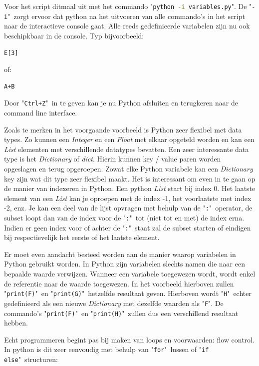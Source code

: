 \documentclass[11pt,twoside]{article}
\begin{document}
Voor het script ditmaal uit met het commando "\lstinline[language=bash]{python -i variables.py}". De "\lstinline[language=bash]{-i}"\ zorgt ervoor dat python na het uitvoeren van alle commando's in het script naar de interactieve console gaat. Alle reeds gedefinieerde variabelen zijn nu ook beschipkbaar in de console. Typ bijvoorbeeld:
\begin{lstlisting}
E[3]
\end{lstlisting}
of:
\begin{lstlisting}
A+B
\end{lstlisting}
Door "\lstinline{Ctrl+Z}"\ in te geven kan je nu Python afsluiten en terugkeren naar de command line interface.

Zoals te merken in het voorgaande voorbeeld is Python zeer flexibel met data types. Zo kunnen een \emph{Integer} en een \emph{Float} met elkaar opgeteld worden en kan een \emph{List} elementen met verschillende datatypes bevatten. Een zeer interessante data type is het \emph{Dictionary} of \emph{dict}. Hierin kunnen key / value paren worden opgeslagen en terug opgeroepen. Zowat elke Python variabele kan een \emph{Dictionary} key zijn wat dit type zeer flexibel maakt. Het is interessant om even in te gaan op de manier van indexeren in Python. Een python \emph{List} start bij index 0. Het laatste element van een \emph{List} kan je oproepen met de index -1, het voorlaatste met index -2, enz. Je kan een deel van de lijst opvragen met behulp van de "\lstinline{:}"\ operator, de subset loopt dan van de index voor de "\lstinline{:}"\ tot (niet tot en met) de index erna. Indien er geen index voor of achter de "\lstinline{:}"\ staat zal de subset starten of eindigen bij respectievelijk het eerste of het laatste element.

Er moet even aandacht besteed worden aan de manier waarop variabelen in Python gebruikt worden. In Python zijn variabelen slechts namen die naar een bepaalde waarde verwijzen. Wanneer een variabele toegewezen wordt, wordt enkel de referentie naar de waarde toegewezen. In het voorbeeld hierboven zullen "\lstinline{print(F)}"\ en "\lstinline{print(G)}"\ hetzelfde resultaat geven. Hierboven wordt "\lstinline{H}"\ echter gedefinieerd als een nieuwe \emph{Dictionary} met dezelfde waarden als "\lstinline{F}". De commando's "\lstinline{print(F)}"\ en "\lstinline{print(H)}"\ zullen dus een verschillend resultaat hebben.

Echt programmeren begint pas bij maken van loops en voorwaarden: flow control. In python is dit zeer eenvoudig met behulp van "\lstinline{for}"\ lussen of "\lstinline{if else}"\ structuren:

\end{document}
